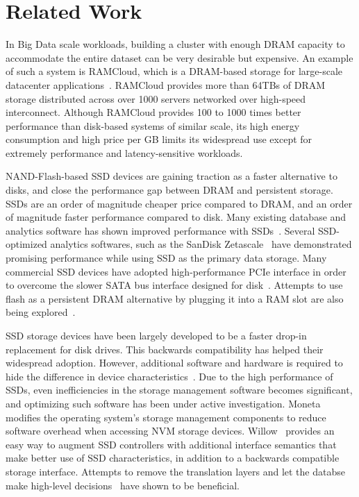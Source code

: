
\section{Related Work}
\label{sec:related}


In Big Data scale workloads, building a cluster with enough DRAM capacity to
accommodate the entire dataset can be very desirable but expensive. An example
of such a system is RAMCloud, which is a DRAM-based storage for large-scale
datacenter applications~\cite{ramcloud, rumble_log_dram}.  RAMCloud provides more than 64TBs of DRAM
storage distributed across over 1000 servers networked over high-speed
interconnect. Although RAMCloud provides 100 to 1000 times better performance
than disk-based systems of similar scale, its high energy consumption and high
price per GB limits its widespread use except for extremely performance and
latency-sensitive workloads.

NAND-Flash-based SSD devices are gaining traction as a faster alternative to
disks, and close the performance gap between DRAM and persistent storage.
SSDs are an order of magnitude cheaper price compared to DRAM,
and an order of magnitude faster performance compared to disk.
Many existing database and analytics software has shown
improved performance with SSDs~\cite{hadoopperf,ssdhadoop,ssddatabase}.
Several SSD-optimized analytics softwares, such as the SanDisk
Zetascale~\cite{zetascale} have demonstrated promising
performance while using SSD as the primary data storage.
Many commercial SSD devices have adopted high-performance PCIe interface in
order to overcome the slower SATA bus interface designed for
disk~\cite{fusionio, violinmemory, intelnvme}. Attempts to
use flash as a persistent DRAM alternative by plugging it into a RAM slot
are also being explored~\cite{diablotechnology}. 

SSD storage devices have been largely developed to be a faster drop-in
replacement for disk drives. This backwards compatibility has helped their 
widespread adoption.  However, additional software and hardware is required to
hide the difference in device characteristics~\cite{ssddesigntradeoff}.  Due to the high performance of
SSDs, even inefficiencies in the storage management software becomes
significant, and optimizing such software has been under active investigation.
Moneta~\cite{ucsd_moneta} modifies the operating system's storage management
components to reduce software overhead when accessing NVM storage devices.
Willow~\cite{ucsd_willow} provides an easy way to augment SSD controllers with
additional interface semantics that make better use of SSD characteristics, in
addition to a backwards compatible storage interface.  Attempts to remove the
translation layers and let the databse make high-level decisions~\cite{noftl}
have shown to be beneficial. 

